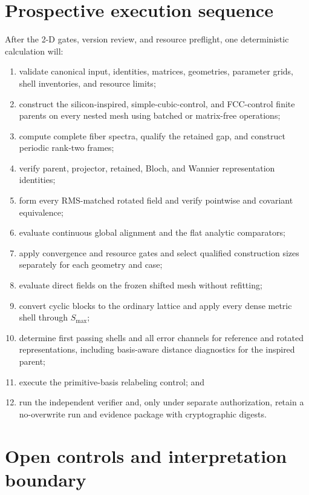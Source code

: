 \documentclass[11pt]{article}
\begin{document}
\section{Prospective execution sequence}

After the 2-D gates, version review, and resource preflight, one deterministic
calculation will:
\begin{enumerate}[label=\arabic*.]
 \item validate canonical input, identities, matrices, geometries, parameter grids,
       shell inventories, and resource limits;
 \item construct the silicon-inspired, simple-cubic-control, and FCC-control finite
       parents on every nested mesh using batched or matrix-free operations;
 \item compute complete fiber spectra, qualify the retained gap, and construct periodic
       rank-two frames;
 \item verify parent, projector, retained, Bloch, and Wannier representation identities;
 \item form every RMS-matched rotated field and verify pointwise and covariant
       equivalence;
 \item evaluate continuous global alignment and the flat analytic comparators;
 \item apply convergence and resource gates and select qualified construction sizes
       separately for each geometry and case;
 \item evaluate direct fields on the frozen shifted mesh without refitting;
 \item convert cyclic blocks to the ordinary lattice and apply every dense metric shell
       through $S_{\max}$;
 \item determine first passing shells and all error channels for reference and rotated
       representations, including basis-aware distance diagnostics for the inspired
       parent;
 \item execute the primitive-basis relabeling control; and
 \item run the independent verifier and, only under separate authorization, retain a
       no-overwrite run and evidence package with cryptographic digests.
\end{enumerate}

\section{Open controls and interpretation boundary}
\end{document}
